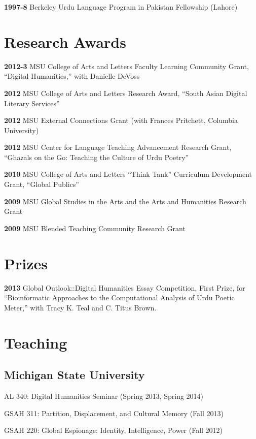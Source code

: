 \documentclass[letterpaper,12pt]{article}
\begin{document}
\textbf{1997-8}
Berkeley Urdu Language Program in Pakistan Fellowship (Lahore)


\section{Research Awards%
  \label{research-awards}%
}

\textbf{2012-3}
MSU College of Arts and Letters Faculty Learning Community Grant,
“Digital Humanities,” with Danielle DeVoss

\textbf{2012}
MSU College of Arts and Letters Research Award,
“South Asian Digital Literary Services”

\textbf{2012}
MSU External Connections Grant (with Frances Pritchett, Columbia University)

\textbf{2012}
MSU Center for Language Teaching Advancement Research Grant,
“Ghazals on the Go: Teaching the Culture of Urdu Poetry”

\textbf{2010}
MSU College of Arts and Letters “Think Tank” Curriculum Development Grant,
“Global Publics”

\textbf{2009} MSU Global Studies in the Arts and the Arts and Humanities Research Grant

\textbf{2009} MSU Blended Teaching Community Research Grant


\section{Prizes%
  \label{prizes}%
}

\textbf{2013}
Global Outlook::Digital Humanities Essay Competition,
First Prize,
for “Bioinformatic Approaches to the Computational Analysis of Urdu Poetic Meter,”
with Tracy K. Teal and C. Titus Brown.


\section{Teaching%
  \label{teaching}%
}


\subsection{Michigan State University%
  \label{michigan-state-university}%
}

AL 340: Digital Humanities Seminar (Spring 2013, Spring 2014)

GSAH 311: Partition, Displacement, and Cultural Memory (Fall 2013)

GSAH 220: Global Espionage: Identity, Intelligence, Power (Fall 2012)
\end{document}
